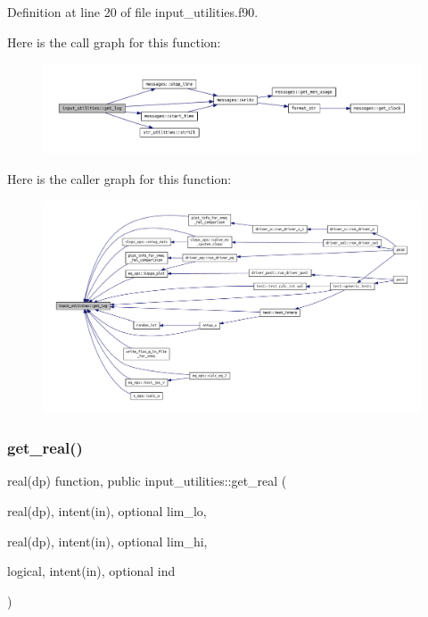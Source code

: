 Definition at line 20 of file input\+\_\+utilities.\+f90.

Here is the call graph for this function\+:
\nopagebreak
\begin{figure}[H]
\begin{center}
\leavevmode
\includegraphics[width=350pt]{namespaceinput__utilities_ad9ce824c30b32041ab70f3fb191f06db_cgraph}
\end{center}
\end{figure}
Here is the caller graph for this function\+:
\nopagebreak
\begin{figure}[H]
\begin{center}
\leavevmode
\includegraphics[width=350pt]{namespaceinput__utilities_ad9ce824c30b32041ab70f3fb191f06db_icgraph}
\end{center}
\end{figure}
\mbox{\label{namespaceinput__utilities_a41fc0c806e12bc722771210cfa1edbd3}} 
\subsubsection{\texorpdfstring{get\+\_\+real()}{get\_real()}}
{\footnotesize\ttfamily real(dp) function, public input\+\_\+utilities\+::get\+\_\+real (\begin{DoxyParamCaption}\item[{real(dp), intent(in), optional}]{lim\+\_\+lo,  }\item[{real(dp), intent(in), optional}]{lim\+\_\+hi,  }\item[{logical, intent(in), optional}]{ind }\end{DoxyParamCaption})}



